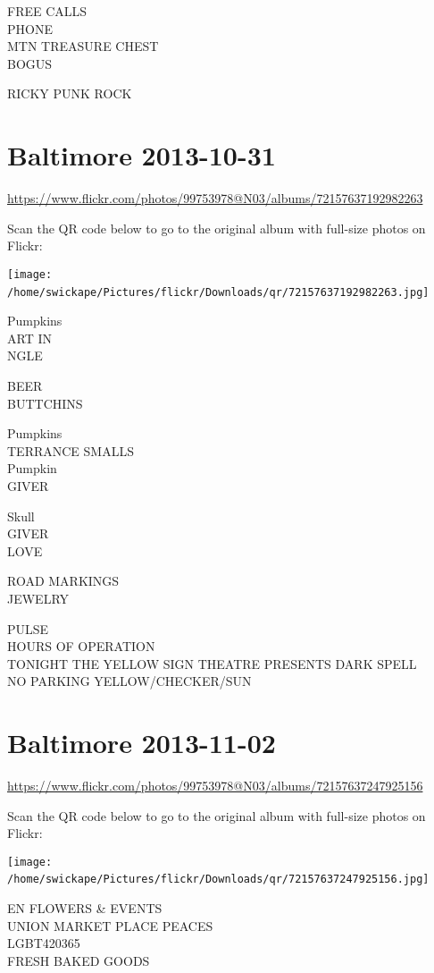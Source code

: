 \documentclass[10pt,letterpaper]{article}
\begin{document}
FREE CALLS\\
PHONE\\
MTN TREASURE CHEST\\
BOGUS

RICKY PUNK ROCK
\

\section*{Baltimore 2013-10-31}

\url{https://www.flickr.com/photos/99753978@N03/albums/72157637192982263}

Scan the QR code below to go to the original album with full-size photos on Flickr:

\texttt{[image: /home/swickape/Pictures/flickr/Downloads/qr/72157637192982263.jpg]}
\

Pumpkins\\
ART IN\\
NGLE

BEER\\
BUTTCHINS

Pumpkins\\
TERRANCE SMALLS\\
Pumpkin\\
GIVER

Skull\\
GIVER\\
LOVE

ROAD MARKINGS\\
JEWELRY

PULSE\\
HOURS OF OPERATION\\
TONIGHT THE YELLOW SIGN THEATRE PRESENTS DARK SPELL\\
NO PARKING YELLOW/CHECKER/SUN
\

\section*{Baltimore 2013-11-02}

\url{https://www.flickr.com/photos/99753978@N03/albums/72157637247925156}

Scan the QR code below to go to the original album with full-size photos on Flickr:

\texttt{[image: /home/swickape/Pictures/flickr/Downloads/qr/72157637247925156.jpg]}
\

EN FLOWERS \& EVENTS\\
UNION MARKET PLACE PEACES\\
LGBT420365\\
FRESH BAKED GOODS
\end{document}
